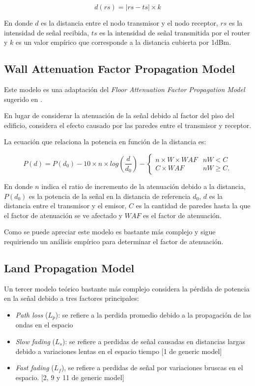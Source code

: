 \documentclass[journal]{IEEEtran}
\begin{document}
$$d(rs) = |rs - ts| \times k$$

En donde $d$ es la distancia entre el nodo transmisor y el nodo receptor, $rs$ es la intensidad de señal recibida, $ts$ es la intensidad de señal transmitida por el router y $k$ es un valor empírico que corresponde a la distancia cubierta por 1dBm.\\

\subsection{Wall Attenuation Factor Propagation Model}

Este modelo es una adaptación del \emph{Floor Attenuation Factor Propagation Model} sugerido en \cite{Sei92, de RADAR}.

En lugar de considerar la atenuación de la señal debido al factor del piso del edificio, considera el efecto causado por las paredes entre el transmisor y receptor.

La ecuación que relaciona la potencia en función de la distancia es:

\begin{equation*}
P(d) = P(d_0) - 10 \times n \times log(\frac {d} {d_0}) - \begin{cases}
n \times W \times WAF &nW < C\\
C \times WAF &nW \geq C.
\end{cases}
\end{equation*}

En donde $n$ indica el ratio de incremento de la atenuación debido a la distancia, $P(d_0)$ es la potencia de la señal en la distancia de referencia $d_0$, $d$ es la distancia entre el transmisor y el emisor, $C$ es la cantidad de paredes hasta la que el factor de atenuación se ve afectado y $WAF$ es el factor de atenuación.

Como se puede apreciar este modelo es bastante más complejo y sigue requiriendo un análisis empírico para determinar el factor de atenuación.

\subsection{Land Propagation Model}

Un tercer modelo teórico bastante más complejo considera la pérdida de potencia en la señal debido a tres factores principales:

\begin{itemize}

\item \emph{Path loss} ($L_p$): se refiere a la perdida promedio debido a la propagación de las ondas en el espacio

\item \emph{Slow fading} ($L_s$): se refiere a perdidas de señal causadas en distancias largas debido a variaciones lentas en el espacio tiempo [1 de generic model]

\item \emph{Fast fading} ($L_f$), se refiere a perdidas de señal por variaciones bruscas en el espacio. [2, 9 y 11 de generic model]

\end{itemize}
\end{document}

